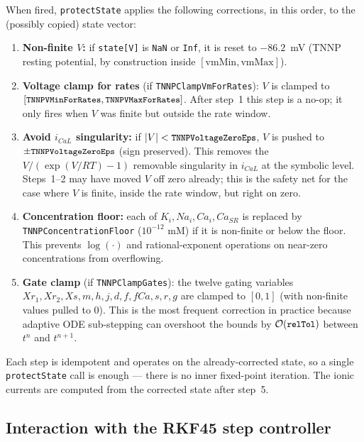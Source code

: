 \documentclass[11pt,a4paper]{article}
\newcommand{\code}[1]{\texttt{\small #1}}
\begin{document}
When fired, \code{protectState} applies the following corrections, in
this order, to the (possibly copied) state vector:

\begin{enumerate}
\item \textbf{Non-finite $V$:} if \code{state[V]} is \code{NaN} or
\code{Inf}, it is reset to $-86.2$~mV (TNNP resting potential, by
construction inside $[\text{vmMin}, \text{vmMax}]$).
\item \textbf{Voltage clamp for rates} (if \code{TNNPClampVmForRates}):
$V$ is clamped to $[\code{TNNPVMinForRates},\code{TNNPVMaxForRates}]$.
After step~1 this step is a no-op; it only fires when $V$ was finite
but outside the rate window.
\item \textbf{Avoid $i_{CaL}$ singularity:} if $|V| <
\code{TNNPVoltageZeroEps}$, $V$ is pushed to $\pm\code{TNNPVoltageZeroEps}$
(sign preserved). This removes the $V/(\exp(V/RT)-1)$ removable
singularity in $i_{CaL}$ at the symbolic level. Steps~1--2 may have
moved $V$ off zero already; this is the safety net for the case
where $V$ is finite, inside the rate window, but right on zero.
\item \textbf{Concentration floor:} each of
$K_{i}, Na_{i}, Ca_{i}, Ca_{SR}$ is replaced by
\code{TNNPConcentrationFloor} ($10^{-12}$ mM) if it is non-finite or
below the floor. This prevents $\log(\cdot)$ and rational-exponent
operations on near-zero concentrations from overflowing.
\item \textbf{Gate clamp} (if \code{TNNPClampGates}): the twelve
gating variables $Xr_{1}, Xr_{2}, Xs, m, h, j, d, f, fCa, s, r, g$
are clamped to $[0, 1]$ (with non-finite values pulled to $0$). This
is the most frequent correction in practice because adaptive ODE
sub-stepping can overshoot the bounds by $\mathcal{O}(\code{relTol})$
between $t^{n}$ and $t^{n+1}$.
\end{enumerate}

Each step is idempotent and operates on the already-corrected state,
so a single \code{protectState} call is enough — there is no inner
fixed-point iteration. The ionic currents are computed from the
corrected state after step~5.

\subsection{Interaction with the RKF45 step controller}
\label{sec:tnnp:rkf45}
\end{document}
